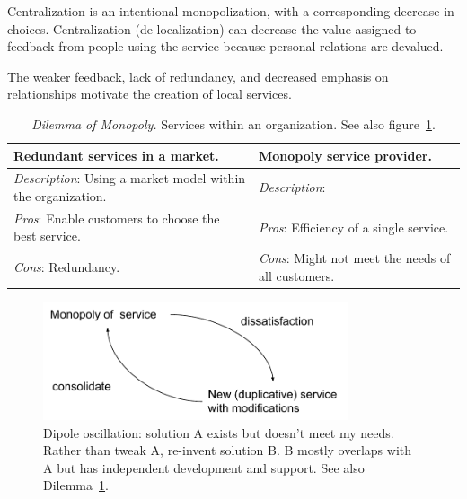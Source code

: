 Centralization is an intentional monopolization, with a corresponding decrease in choices. 
Centralization (de-localization) can decrease the value assigned to feedback from people using the service because personal relations are devalued. 

The weaker feedback, lack of redundancy, and decreased emphasis on relationships motivate the creation of local services. 


\begin{center}
\begin{table}[H] %
\begin{tabular}{ | m{\dilemmatablewidth}| m{\dilemmatablewidth} | } 
  \hline
  \textbf{Redundant services in a market.} &
  \textbf{Monopoly service provider.} \\
  \hline
  \textit{Description}: Using a market model within the organization. &
  \textit{Description}:  \\  
  \hline
  \textit{Pros}: Enable customers to choose the best service. &
  \textit{Pros}: Efficiency of a single service. \\
  \hline
  \textit{Cons}: Redundancy. & 
  \textit{Cons}: Might not meet the needs of all customers. \\
  \hline
\end{tabular}
\caption{
\textit{Dilemma of Monopoly.}
Services within an organization. See also figure~\ref{fig:market-vs-monopoly}.
}
\label{table:dilemma-org-market-vs-monopoly}
\end{table}
\end{center}


\begin{figure}[H] %
    \centering
    \includegraphics[width=0.8\textwidth]{images/dilemma_market_vs_monopoly.pdf}
    \caption{Dipole oscillation: solution A exists but doesn't meet my needs. Rather than tweak A, re-invent solution B. B mostly overlaps with A but has independent development and support. See also Dilemma~\ref{table:dilemma-org-market-vs-monopoly}.}
    \label{fig:market-vs-monopoly}
\end{figure}

